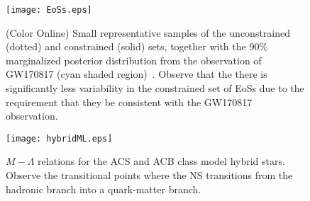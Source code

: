 \documentclass[prd,twocolumn,nofootinbib,superscriptaddress,amsmath,amssymb]{revtex4-1}
\begin{document}
\begin{figure}
\begin{center} 
\texttt{[image: EoSs.eps]}
\end{center}
\caption{(Color Online) Small representative samples of the unconstrained (dotted) and constrained (solid) sets, together with the 90\% marginalized posterior distribution from the observation of GW170817 (cyan shaded region)~\cite{LIGO:posterior}. Observe that the there is significantly less variability in the constrained set of EoSs due to the requirement that they be consistent with the GW170817 observation.}
\label{fig:eos}
\end{figure} 

\begin{figure}
\begin{center} 
\texttt{[image: hybridML.eps]}
\end{center}
\caption{
$M-\Lambda$ relations for the ACS and ACB class model hybrid stars. 
Observe the transitional points where the NS transitions from the hadronic branch into a quark-matter branch.
}
\label{fig:hybridML}
\end{figure} 

{} 
\end{document}
